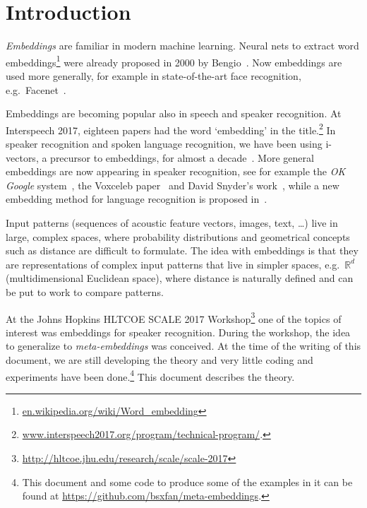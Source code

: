 \documentclass[a4paper,oneside,12pt,english]{report}
\def\R{\mathbb{R}}
\begin{document}
\maketitle



\hypersetup{pageanchor=true}


\tableofcontents
\listoffigures



\chapter{Introduction}

\emph{Embeddings} are familiar in modern machine learning. Neural nets to extract word embeddings\footnote{\url{en.wikipedia.org/wiki/Word_embedding}} were already proposed in 2000 by Bengio~\cite{Bengio_word_embedding}. Now embeddings are used more generally, for example in state-of-the-art face recognition, e.g.\ Facenet~\cite{Facenet}.

Embeddings are becoming popular also in speech and speaker recognition. At Interspeech 2017, eighteen papers had the word `embedding' in the title.\footnote{\url{www.interspeech2017.org/program/technical-program/}.} In speaker recognition and spoken language recognition, we have been using i-vectors, a precursor to embeddings, for almost a decade~\cite{ivector-Brighton,ivec,BUT_ivector_language}. More general embeddings are now appearing in speaker recognition, see for example the \emph{OK Google} system~\cite{end2end_google}, the Voxceleb paper~\cite{Voxceleb} and David Snyder's work~\cite{end2end,DSIS17,DS_ICASSP18}, while a new embedding method for language recognition is proposed in~\cite{LIMSI_Language_embedding}. 
 
Input patterns (sequences of acoustic feature vectors, images, text, \ldots) live in large, complex spaces, where probability distributions and geometrical concepts such as distance are difficult to formulate. The idea with embeddings is that they are representations of complex input patterns that live in simpler spaces, e.g.\ $\R^d$ (multidimensional Euclidean space), where distance is naturally defined and can be put to work to compare patterns. 

At the Johns Hopkins HLTCOE SCALE 2017 Workshop\footnote{\url{http://hltcoe.jhu.edu/research/scale/scale-2017}} one of the topics of interest was embeddings for speaker recognition. During the workshop, the idea to generalize to \emph{meta-embeddings} was conceived. At the time of the writing of this document, we are still developing the theory and very little coding and experiments have been done.\footnote{This document and some code to produce some of the examples in it can be found at \url{https://github.com/bsxfan/meta-embeddings}.} This document describes the theory.    
\end{document}
